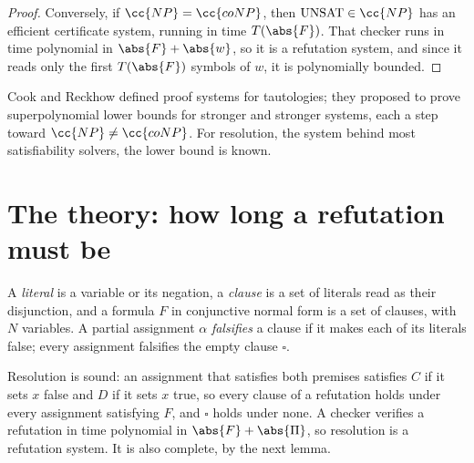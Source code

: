 \begin{refsection}
\begin{proof}
Conversely, if $\cc{NP}=\cc{coNP}$, then $\certificatesUNSAT\in\cc{NP}$ has an efficient certificate system, running in time $T(\abs{F})$. That checker runs in time polynomial in $\abs{F}+\abs{w}$, so it is a refutation system, and since it reads only the first $T(\abs{F})$ symbols of $w$, it is polynomially bounded.
\end{proof}

Cook and Reckhow defined proof systems for tautologies; they proposed to prove superpolynomial lower bounds for stronger and stronger systems, each a step toward $\cc{NP}\ne\cc{coNP}$. For resolution, the system behind most satisfiability solvers, the lower bound is known.

\section{The theory: how long a refutation must be}\label{sec:certificates:resolution}

A \emph{literal} is a variable or its negation, a \emph{clause} is a set of literals read as their disjunction, and a formula $F$ in conjunctive normal form is a set of clauses, with $N$ variables. A partial assignment $\alpha$ \emph{falsifies} a clause if it makes each of its literals false; every assignment falsifies the empty clause $\square$.


Resolution is sound: an assignment that satisfies both premises satisfies $C$ if it sets $x$ false and $D$ if it sets $x$ true, so every clause of a refutation holds under every assignment satisfying $F$, and $\square$ holds under none. A checker verifies a refutation in time polynomial in $\abs{F}+\abs{\Pi}$, so resolution is a refutation system. It is also complete, by the next lemma.


\end{refsection}

